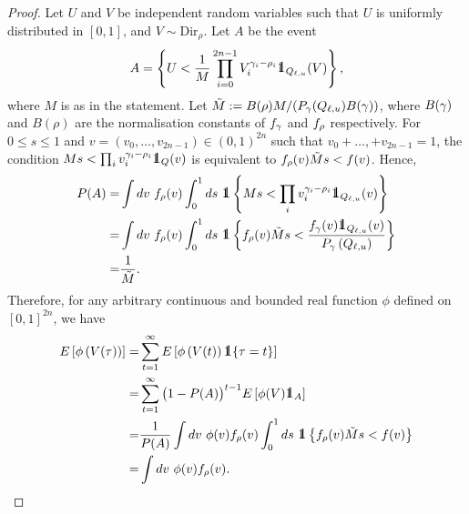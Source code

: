 \documentclass[10pt]{article}
\begin{document}
\begin{proof}
 Let $U$ and $V$ be independent random variables such that  $U$ is uniformly distributed in $[0,1]$, and $V \sim \text{Dir}_{\rho}$. Let $A$ be the event 
 \begin{equation*}
  A  =
  \left\lbrace
  U < \frac{1}{M} \prod_{i=0}^{2n-1} V_{i}^{\dirparam_i - \rho_i} \one_{Q_{\ell,u}}(V)  
  \right\rbrace,
 \end{equation*}
 where $M$ is as in the statement. Let $\tilde{M}:= B(\rho) M / (\Prob_{\dirparam}(Q_{\ell, u}) B(\dirparam) )$, where $B(\dirparam)$ and  $B(\rho)$ are the normalisation constants of $\dirichletDensity[\dirparam]$ and $\dirichletDensity[\rho]$ respectively.  For $0\leq s \leq 1$ and $v=(v_0,\dots,v_{2n-1}) \in (0,1)^{2n}$ such that $v_0 + \dots, + v_{2n-1} = 1 $, the condition $ M s < \prod_i v_{i}^{\dirparam_i - \rho_i} \one_{Q}(v)$ is equivalent to $\dirichletDensity[\rho](v) \tilde{M} s  < \targetDensity(v)$. Hence, 
 \begin{equation*}
  \begin{split}
   \Prob(A) = &
   \int dv \, \, \dirichletDensity[\rho](v)
   \int_{0}^{1}ds\, \, 
   \one\left\lbrace
   M s < \prod_i v_{i}^{\dirparam_i - \rho_i} \one_{Q_{\ell,u}}(v)
   \right\rbrace
   \\
   = &
   \int dv \,\, \dirichletDensity[\rho](v)
   \int_{0}^{1}ds \, \, 
   \one\left\lbrace
   \dirichletDensity[\rho](v) \tilde{M} s  < \frac{\dirichletDensity(v)\one _{Q_{\ell,u}} (v)}{\dirichletLaw\left(Q_{\ell,u}\right)}
   \right\rbrace
   \\
   = &
   \frac{1}{\tilde{M}}.
  \end{split}
 \end{equation*}
Therefore, for any arbitrary continuous and bounded real function $\phi$ defined on $[0,1]^{2n}$, we have
\begin{equation*}
 \begin{split}
  \Expectation\left[ \phi\left( V(\tau) \right)\right]
  = &
  \sum_{t=1}^{\infty} \Expectation\left[ \phi\left( V(t)\right) \one \lbrace \tau = t \rbrace \right]
  \\
  = & 
  \sum_{t=1}^{\infty} \big(1-\Prob(A)\big)^{t-1}\Expectation\left[ \phi(V)\one_{A}\right]
  \\
  = &
  \frac{1}{\Prob(A)}
  \int dv \,\,\phi(v) \dirichletDensity[\rho](v)
   \int_{0}^{1}ds \, \, 
   \one\left\lbrace
   \dirichletDensity[\rho](v) \tilde{M} s  < \targetDensity(v)
   \right\rbrace
   \\
   = &
   \int dv \,\, \phi(v)  \dirichletDensity[\rho](v).
 \end{split}
\end{equation*}
\end{proof}
\end{document}
